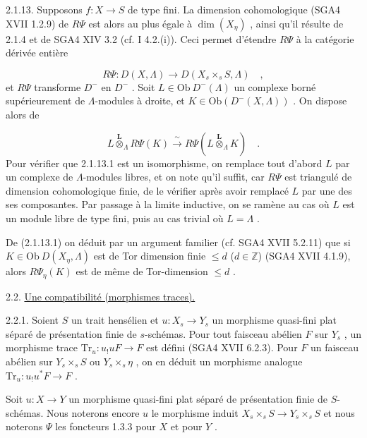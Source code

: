 2.1.13. Supposons $f : X \to S$ de type fini. La dimension cohomologique (SGA4 XVII 1.2.9) de $R\Psi$ est alors au plus égale à $\dim(X_\eta)$ , ainsi qu'il résulte de 2.1.4 et de SGA4 XIV 3.2 (cf. I 4.2.(i)). Ceci permet d'étendre $R\Psi$ à la catégorie dérivée entière

\begin{equation*}
R\Psi : D(X, \Lambda) \longrightarrow D(X_s \times_s S, \Lambda) \quad ,
\end{equation*}
et $R\Psi$ transforme $D^-$ en $D^-$ . Soit $L \in \mathrm{Ob}\ D^-(\Lambda)$ un complexe borné supérieurement de $\Lambda$-modules à droite, et $K \in \mathrm{Ob}(D^-(X, \Lambda))$ . On dispose alors de 



\begin{equation}\tag{2.1.13.1}
 L \overset{\mathbf{L}}{\otimes}_{\Lambda} R\Psi(K) \xrightarrow{\ \sim\ } R\Psi(L \overset{\mathbf{L}}{\otimes}_{\Lambda} K) \quad .
\end{equation}
Pour vérifier que 2.1.13.1 est un isomorphisme, on remplace tout d'abord $L$ par un complexe de $\Lambda$-modules libres, et on note qu'il suffit, car $R\Psi$ est triangulé de dimension cohomologique finie, de le vérifier après avoir remplacé $L$ par une des ses composantes. Par passage à la limite inductive, on se ramène au cas où $L$ est un module libre de type fini, puis au cas trivial où $L = \Lambda$ .

De (2.1.13.1) on déduit par un argument familier (cf. SGA4 XVII 5.2.11) que si $K \in \mathrm{Ob}\ D (X_\eta, \Lambda)$ est de Tor dimension finie $\leq d$ ($d \in \mathbb{Z}$) (SGA4 XVII 4.1.9), alors $R\Psi_\eta(K)$ est de même de Tor-dimension $\leq d$ .


2.2. \underline{Une compatibilité (morphismes traces).}

2.2.1. Soient $S$ un trait hensélien et $u : X_s \to Y_s$ un morphisme quasi-fini plat séparé de présentation finie de $s$-schémas. Pour tout faisceau abélien $F$ sur $Y_s$ , un morphisme trace $\mathrm{Tr}_u : u_! u F \to F$ est défini (SGA4 XVII 6.2.3). Pour $F$ un faisceau abélien sur $Y_s \times_s S$ ou $Y_s \times_s \eta$ , on en déduit un morphisme analogue $\mathrm{Tr}_u : u_! u^* F \to F$ .

Soit $u : X \to Y$ un morphisme quasi-fini plat séparé de présentation finie de $S$-schémas. Nous noterons encore $u$ le morphisme induit $X_s \times_s S \to Y_s \times_s S$ et nous noterons $\Psi$ les foncteurs 1.3.3 pour $X$ et pour $Y$ .

